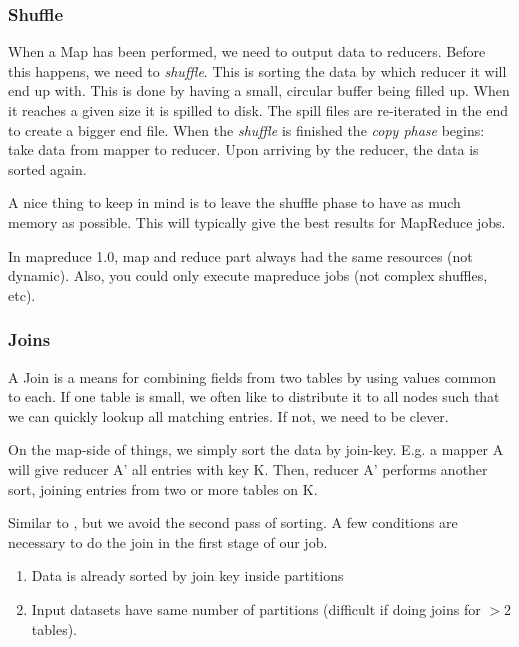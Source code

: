 \subsubsection{Shuffle}
When a Map has been performed, we need to output data to reducers. Before this happens,
we need to \textit{shuffle}. This is sorting the data by which reducer it will end up with. This is done by having a small, circular buffer being filled up. When it reaches
a given size it is spilled to disk. The spill files are re-iterated in the end to create
a bigger end file. When the \textit{shuffle} is finished the \textit{copy phase} begins: take data from mapper to reducer. Upon arriving by the reducer, the data is sorted again.

A nice thing to keep in mind is to leave the shuffle phase to have as much memory as possible. This will typically give the best results for MapReduce jobs.

In mapreduce 1.0, map and reduce part always had the same resources (not dynamic). Also, you could only execute mapreduce jobs (not complex shuffles, etc).

\subsubsection{Joins}
A Join is a means for combining fields from two tables by using values common to each.
If one table is small, we often like to distribute it to all nodes such that we 
can quickly lookup all matching entries. If not, we need to be clever.


\begin{definition}\label{def:reducejoin}
    On the map-side of things, we simply sort the data by join-key. E.g. a mapper A
    will give reducer A' all entries with key K. Then, reducer A' performs another sort,
    joining entries from two or more tables on K.
\end{definition}


\begin{definition}\label{def:mapjoin}
    Similar to , but we avoid the second pass of sorting.
    A few conditions are necessary to do the join in the first stage of our job.
    \begin{enumerate}
        \item Data is already sorted by join key inside partitions
        \item Input datasets have same number of partitions (difficult if doing joins 
            for $> 2$ tables).
    \end{enumerate}
\end{definition}

